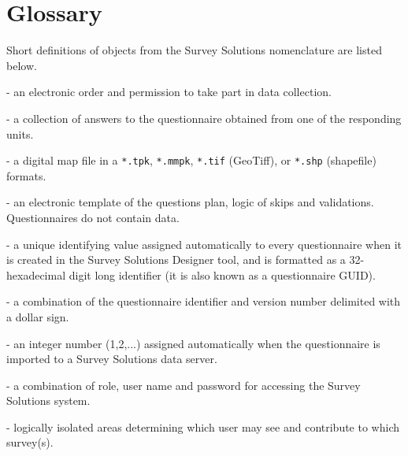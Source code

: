 \section{Glossary}
\vskip16pt
Short definitions of objects from the Survey Solutions nomenclature are listed
below.\par
\vskip16pt

 - an electronic order and permission to take part in data
collection.\par

 - a collection of answers to the questionnaire obtained
from one of the responding units.\par

 - a digital map file in a \texttt{*.tpk}, \texttt{*.mmpk},
\texttt{*.tif} (GeoTiff), or \texttt{*.shp} (shapefile) formats.\par

 - an electronic template of the questions plan, logic
of skips and validations. Questionnaires do not contain data.\par

 - a unique identifying value assigned
automatically to every questionnaire when it is created in the Survey Solutions
Designer tool, and is formatted as a 32-hexadecimal digit long identifier (it
is also known as a questionnaire GUID).

 - a combination of the questionnaire
identifier and version number delimited with a dollar sign.

 - an integer number (1,2,...) assigned
automatically when the questionnaire is imported to a Survey Solutions data
server.

 - a combination of role, user name and password for accessing
the Survey Solutions system.\par

 - logically isolated areas determining which user may see
and contribute to which survey(s).\par
